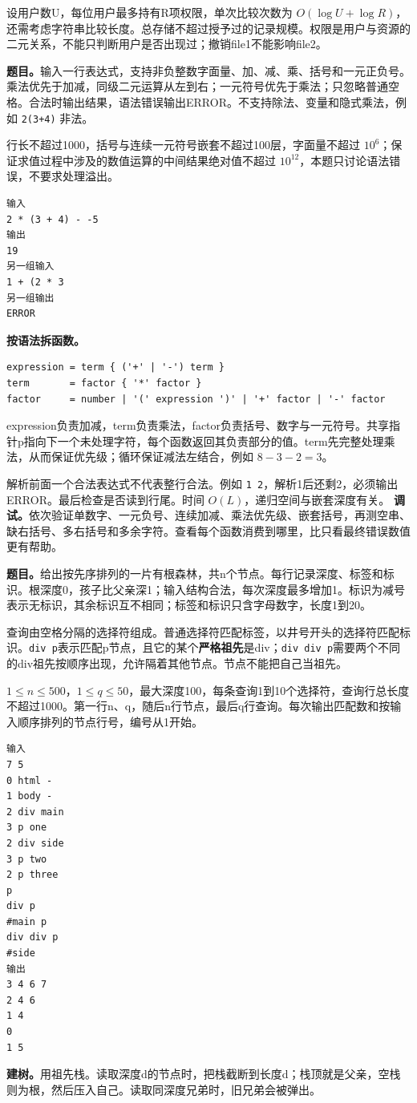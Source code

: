 设用户数U，每位用户最多持有R项权限，单次比较次数为 $O(\log U+\log R)$，还需考虑字符串比较长度。总存储不超过授予过的记录规模。权限是用户与资源的二元关系，不能只判断用户是否出现过；撤销file1不能影响file2。

\textbf{题目。}输入一行表达式，支持非负整数字面量、加、减、乘、括号和一元正负号。乘法优先于加减，同级二元运算从左到右；一元符号优先于乘法；只忽略普通空格。合法时输出结果，语法错误输出ERROR。不支持除法、变量和隐式乘法，例如 \texttt{2(3+4)} 非法。

行长不超过1000，括号与连续一元符号嵌套不超过100层，字面量不超过 $10^6$；保证求值过程中涉及的数值运算的中间结果绝对值不超过 $10^{12}$，本题只讨论语法错误，不要求处理溢出。
\begin{verbatim}
输入
2 * (3 + 4) - -5
输出
19
另一组输入
1 + (2 * 3
另一组输出
ERROR
\end{verbatim}
\textbf{按语法拆函数。}
\begin{verbatim}
expression = term { ('+' | '-') term }
term       = factor { '*' factor }
factor     = number | '(' expression ')' | '+' factor | '-' factor
\end{verbatim}
expression负责加减，term负责乘法，factor负责括号、数字与一元符号。共享指针p指向下一个未处理字符，每个函数返回其负责部分的值。term先完整处理乘法，从而保证优先级；循环保证减法左结合，例如 $8-3-2=3$。

解析前面一个合法表达式不代表整行合法。例如 \texttt{1 2}，解析1后还剩2，必须输出ERROR。最后检查是否读到行尾。时间 $O(L)$，递归空间与嵌套深度有关。
\textbf{调试。}依次验证单数字、一元负号、连续加减、乘法优先级、嵌套括号，再测空串、缺右括号、多右括号和多余字符。查看每个函数消费到哪里，比只看最终错误数值更有帮助。

\textbf{题目。}给出按先序排列的一片有根森林，共n个节点。每行记录深度、标签和标识。根深度0，孩子比父亲深1；输入结构合法，每次深度最多增加1。标识为减号表示无标识，其余标识互不相同；标签和标识只含字母数字，长度1到20。

查询由空格分隔的选择符组成。普通选择符匹配标签，以井号开头的选择符匹配标识。\texttt{div p}表示匹配p节点，且它的某个\textbf{严格祖先}是div；\texttt{div div p}需要两个不同的div祖先按顺序出现，允许隔着其他节点。节点不能把自己当祖先。

$1\le n\le500$，$1\le q\le50$，最大深度100，每条查询1到10个选择符，查询行总长度不超过1000。第一行n、q，随后n行节点，最后q行查询。每次输出匹配数和按输入顺序排列的节点行号，编号从1开始。
\begin{verbatim}
输入
7 5
0 html -
1 body -
2 div main
3 p one
2 div side
3 p two
2 p three
p
div p
#main p
div div p
#side
输出
3 4 6 7
2 4 6
1 4
0
1 5
\end{verbatim}
\textbf{建树。}用祖先栈。读取深度d的节点时，把栈截断到长度d；栈顶就是父亲，空栈则为根，然后压入自己。读取同深度兄弟时，旧兄弟会被弹出。

